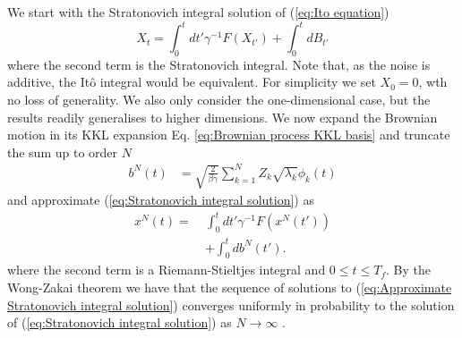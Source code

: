 We start with the Stratonovich integral solution of (\ref{eq:Ito equation})
\begin{equation} \label{eq:Stratonovich integral solution}
X_t = \int_0^t dt' \gamma^{-1} F(X_{t'}) + \int_0^t dB_{t'}
\end{equation}
where the second term is the Stratonovich integral. Note that, as the noise is additive, the It\^{o} integral would be equivalent. For simplicity we set $X_0 = 0$, wth no loss of generality. We also only consider the one-dimensional case, but the results readily generalises to higher dimensions. We now expand the Brownian motion in its KKL expansion Eq. \ref{eq:Brownian process KKL basis} and truncate the sum up to order $N$
\begin{subequations}
\begin{align}
b^N(t) & = \sqrt{\frac{2}{\beta \gamma}} \sum_{k=1}^N Z_k \sqrt{\lambda_k} \phi_k(t)
\end{align}
\end{subequations}
and approximate (\ref{eq:Stratonovich integral solution}) as
\begin{equation} \label{eq:Approximate Stratonovich integral solution}
\begin{aligned} 
x^N(t) =\ & \int_0^t dt' \gamma^{-1} F(x^N(t'))  \\
& + \int_0^t db^N(t').
\end{aligned} 
\end{equation}
where the second term is a Riemann-Stieltjes integral and $0 \leq t \leq T_f$. By the Wong-Zakai theorem we have that the sequence of solutions to (\ref{eq:Approximate Stratonovich integral solution}) converges uniformly in probability to the solution of (\ref{eq:Stratonovich integral solution}) as $N\to\infty$ \citep{wongConvergenceOrdinaryIntegrals1965, twardowskaWongZakaiApproximationsStochastic1996, frizMultidimensionalStochasticProcesses2010}.

